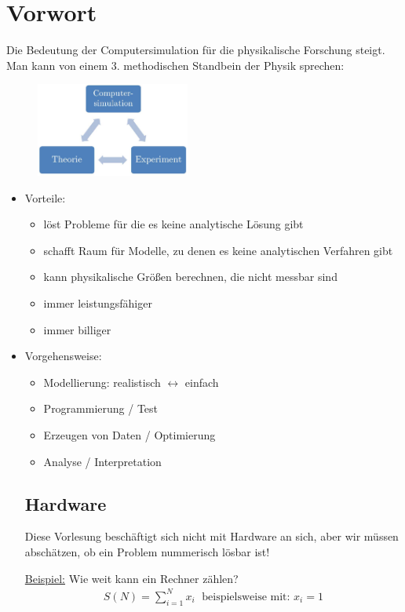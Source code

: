 \documentclass[12pt]{article}
\begin{document}
\section*{Vorwort}
Die Bedeutung der Computersimulation für die physikalische Forschung steigt. Man kann von einem 3. methodischen Standbein der Physik sprechen: 
\begin{figure}[ht]
	\centering
  \includegraphics[width=0.45\textwidth]{Null_DrittesStandbein.jpg}
	\label{Null_DrittesStandbein}
\end{figure}
\begin{itemize}
\item Vorteile:

\begin{itemize}
\item löst Probleme für die es keine analytische Lösung gibt
\item schafft Raum für Modelle, zu denen es keine analytischen Verfahren gibt
\item kann physikalische Größen berechnen, die nicht messbar sind 
\item immer leistungsfähiger
\item immer billiger
\end{itemize}


\item Vorgehensweise:

\begin{itemize}
\item Modellierung: realistisch $\longleftrightarrow$ einfach
\item Programmierung / Test
\item Erzeugen von Daten / Optimierung
\item Analyse / Interpretation
\end{itemize}

\subsection{Hardware}
Diese Vorlesung beschäftigt sich nicht mit Hardware an sich, aber wir müssen abschätzen, ob ein Problem nummerisch lösbar ist! 

\underline{Beispiel:} Wie weit kann ein Rechner zählen?
\begin{align*}
S(N)= \sum_{i=1}^N x_i \; \mbox{  beispielsweise mit: } x_i = 1
\end{align*}
\end{itemize}
\end{document}
